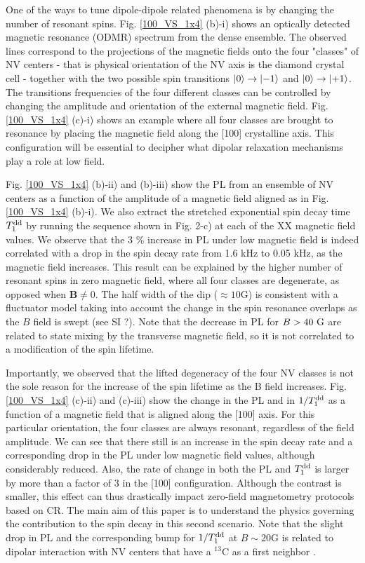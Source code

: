 \documentclass[preprintnumbers,amsmath,amssymb,superscriptaddress,twocolumn,showpacs]{revtex4-2}
\begin{document}
One of the ways to tune dipole-dipole related phenomena is by changing the number of resonant spins. Fig. \ref{100_VS_1x4} (b)-i) shows an optically detected magnetic resonance (ODMR) spectrum from the dense ensemble. The observed lines correspond to the projections of the magnetic fields onto the four "classes" of NV centers - that is physical orientation of the NV axis is the diamond crystal cell - together with the two possible spin transitions $\ket{0}\to\ket{-1}$ and $\ket{0}\to\ket{+1}$. The transitions frequencies of the four different classes can be controlled by changing the amplitude and orientation of the external magnetic field. Fig. \ref{100_VS_1x4} (c)-i) shows an example where all four classes are brought to resonance by placing the magnetic field along the [100] crystalline axis. 
This configuration will be essential to decipher what dipolar relaxation mechanisms play a role at low field. 

Fig. \ref{100_VS_1x4} (b)-ii) and (b)-iii) show the PL from an ensemble of NV centers as a function of the amplitude of a magnetic field aligned as in Fig. \ref{100_VS_1x4} (b)-i). 
We also extract the stretched exponential spin decay time $T_1^{\rm dd}$ by running the sequence shown in Fig. 2-c) at each of the XX magnetic field values. 
We observe that the 3 \% increase in PL under low magnetic field is indeed correlated with a drop in the spin decay rate from 1.6 kHz to 0.05 kHz, as the magnetic field increases. This result can be explained by the higher number of resonant spins in zero magnetic field, where all four classes are degenerate, as opposed when $\bm B \neq 0$. The half width of the dip ($\approx 10$G) is consistent with a fluctuator model taking into account the change in the spin resonance overlaps as the $B$ field is swept (see SI ?).
Note that the decrease in PL for $B>40\ \rm G$ are related to state mixing by the transverse magnetic field, so it is not correlated to a modification of the spin lifetime. 

Importantly, we observed that the lifted degeneracy of the four NV classes is not the sole reason for the increase of the spin lifetime as the B field increases. Fig. \ref{100_VS_1x4} (c)-ii) and (c)-iii) show the change in the PL and in $1/T_1^{\rm dd}$ as a function of a magnetic field that is aligned along the [100] axis. For this particular orientation, the four classes are always resonant, regardless of the field amplitude. We can see that there still is an increase in the spin decay rate and a corresponding drop in the PL under low magnetic field values, although considerably reduced. Also, the rate of change in both the PL and $T_1^{\rm dd}$ is larger by more than a factor of 3 in the [100] configuration. Although the contrast is smaller, this effect can thus drastically impact zero-field magnetometry protocols based on CR.
The main aim of this paper is to understand the physics governing the contribution to the spin decay in this second scenario. Note that the slight drop in PL and the corresponding bump for $1/T_1^{\rm dd}$ at $B \sim 20$G is related to dipolar interaction with NV centers that have a $^{13}$C as a first neighbor \cite{pellet2021optical}. 
\end{document}
